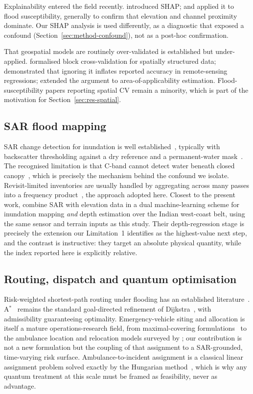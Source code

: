 \documentclass[journal]{IEEEtran}
\begin{document}
Explainability entered the field recently. \citet{lundberg2017} introduced SHAP;
\citet{aydin2022} and \citet{seydi2023} applied it to flood susceptibility,
generally to confirm that elevation and channel proximity dominate. Our SHAP
analysis is used differently, as a diagnostic that exposed a confound
(Section~\ref{sec:method-confound}), not as a post-hoc confirmation.

That geospatial models are routinely over-validated is established but
under-applied. \citet{roberts2017} formalised block cross-validation for
spatially structured data; \citet{ploton2020} demonstrated that ignoring it
inflates reported accuracy in remote-sensing regressions; \citet{meyer2021}
extended the argument to area-of-applicability estimation. Flood-susceptibility
papers reporting spatial CV remain a minority, which is part of the motivation
for Section~\ref{sec:res-spatial}.

\subsection{SAR flood mapping}
SAR change detection for inundation is well established~\citep{martinis2009,
twele2016,shen2019}, typically with backscatter thresholding against a dry
reference and a permanent-water mask~\citep{pekel2016}. The recognised limitation
is that C-band cannot detect water beneath closed
canopy~\citep{townsend2002,tsyganskaya2018}, which is precisely the mechanism
behind the confound we isolate. Revisit-limited inventories are usually handled
by aggregating across many passes into a frequency
product~\citep{pekel2016,donchyts2016}, the approach adopted here.
Closest to the present work, \citet{sadhwani2026} combine SAR with elevation data
in a dual machine-learning scheme for inundation mapping \emph{and} depth
estimation over the Indian west-coast belt, using the same sensor and terrain
inputs as this study. Their depth-regression stage is precisely the extension our
Limitation~1 identifies as the highest-value next step, and the contrast is
instructive: they target an absolute physical quantity, while the index reported
here is explicitly relative.

\subsection{Routing, dispatch and quantum optimisation}
Risk-weighted shortest-path routing under flooding has an established
literature~\citep{zhang2019,yin2016}. A$^\ast$~\citep{hart1968} remains the
standard goal-directed refinement of Dijkstra~\citep{dijkstra1959}, with
admissibility guaranteeing optimality. Emergency-vehicle siting and allocation is
itself a mature operations-research field, from maximal-covering
formulations~\citep{church1974} to the ambulance location and relocation models
surveyed by \citet{brotcorne2003}; our contribution is not a new formulation but
the coupling of that assignment to a SAR-grounded, time-varying risk surface.
Ambulance-to-incident assignment is a classical linear assignment problem solved
exactly by the Hungarian method~\citep{kuhn1955}, which is why any quantum
treatment at this scale must be framed as feasibility, never as advantage.
\end{document}
